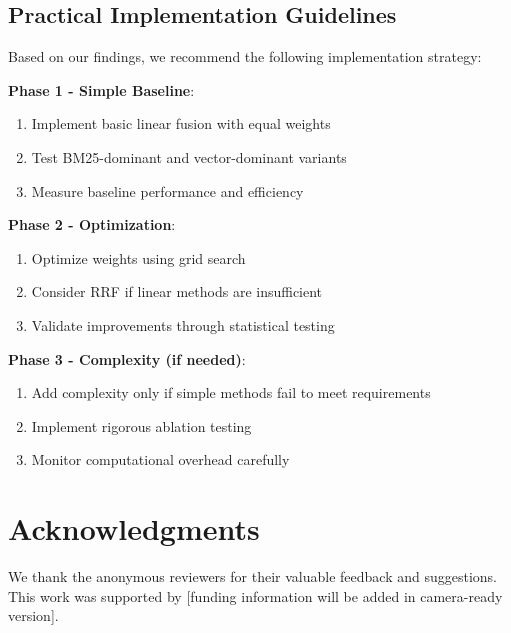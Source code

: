 \documentclass[letterpaper]{article} %
\begin{document}
\subsection{Practical Implementation Guidelines}

Based on our findings, we recommend the following implementation strategy:

\textbf{Phase 1 - Simple Baseline}:
\begin{enumerate}
\item Implement basic linear fusion with equal weights
\item Test BM25-dominant and vector-dominant variants
\item Measure baseline performance and efficiency
\end{enumerate}

\textbf{Phase 2 - Optimization}:
\begin{enumerate}
\item Optimize weights using grid search
\item Consider RRF if linear methods are insufficient
\item Validate improvements through statistical testing
\end{enumerate}

\textbf{Phase 3 - Complexity (if needed)}:
\begin{enumerate}
\item Add complexity only if simple methods fail to meet requirements
\item Implement rigorous ablation testing
\item Monitor computational overhead carefully
\end{enumerate}

\section*{Acknowledgments}

We thank the anonymous reviewers for their valuable feedback and suggestions. This work was supported by [funding information will be added in camera-ready version].


\end{document}
